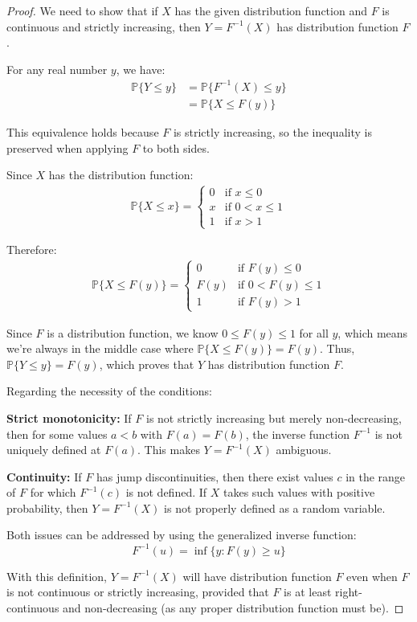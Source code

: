 \documentclass[letterpaper, 11pt]{article}
\newcommand{\1}{\mathds{1}}	%
\theoremstyle{definition}
\begin{document}
   \begin{proof}
    We need to show that if $X$ has the given distribution function and $F$ is continuous and strictly increasing, then $Y = F^{-1}(X)$ has distribution function $F$.

    For any real number $y$, we have:
    \begin{align*}
    \mathbb{P}\{Y \leq y\} &= \mathbb{P}\{F^{-1}(X) \leq y\} \\
    &= \mathbb{P}\{X \leq F(y)\}
    \end{align*}
    
    This equivalence holds because $F$ is strictly increasing, so the inequality is preserved when applying $F$ to both sides.
    
    Since $X$ has the distribution function:
    \begin{align*}
    \mathbb{P}\{X \leq x\} = 
    \begin{cases}
    0 & \text{if } x \leq 0 \\
    x & \text{if } 0 < x \leq 1 \\
    1 & \text{if } x > 1
    \end{cases}
    \end{align*}
    
    Therefore:
    \begin{align*}
    \mathbb{P}\{X \leq F(y)\} = 
    \begin{cases}
    0 & \text{if } F(y) \leq 0 \\
    F(y) & \text{if } 0 < F(y) \leq 1 \\
    1 & \text{if } F(y) > 1
    \end{cases}
    \end{align*}
    
    Since $F$ is a distribution function, we know $0 \leq F(y) \leq 1$ for all $y$, which means we're always in the middle case where $\mathbb{P}\{X \leq F(y)\} = F(y)$. Thus, $\mathbb{P}\{Y \leq y\} = F(y)$, which proves that $Y$ has distribution function $F$.
    
    Regarding the necessity of the conditions:
    
    \textbf{Strict monotonicity:} If $F$ is not strictly increasing but merely non-decreasing, then for some values $a < b$ with $F(a) = F(b)$, the inverse function $F^{-1}$ is not uniquely defined at $F(a)$. This makes $Y = F^{-1}(X)$ ambiguous.
    
    \textbf{Continuity:} If $F$ has jump discontinuities, then there exist values $c$ in the range of $F$ for which $F^{-1}(c)$ is not defined. If $X$ takes such values with positive probability, then $Y = F^{-1}(X)$ is not properly defined as a random variable.
    
    Both issues can be addressed by using the generalized inverse function:
    \[ F^{-1}(u) = \inf\{y: F(y) \geq u\} \]
    
    With this definition, $Y = F^{-1}(X)$ will have distribution function $F$ even when $F$ is not continuous or strictly increasing, provided that $F$ is at least right-continuous and non-decreasing (as any proper distribution function must be).
   \end{proof}
\end{document}
